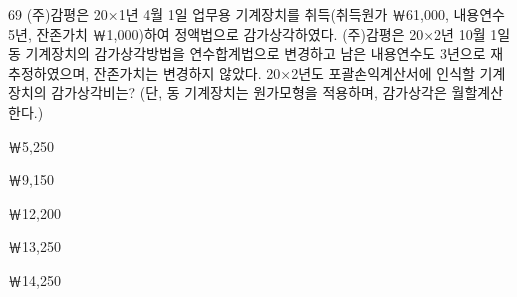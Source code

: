 \begin{question}{69}
(주)감평은 20×1년 4월 1일 업무용 기계장치를 취득(취득원가 ￦61,000, 내용연수 5년, 잔존가치 ￦1,000)하여 정액법으로 감가상각하였다. (주)감평은 20×2년 10월 1일 동 기계장치의 감가상각방법을 연수합계법으로 변경하고 남은 내용연수도 3년으로 재추정하였으며, 잔존가치는 변경하지 않았다. 20×2년도 포괄손익계산서에 인식할 기계장치의 감가상각비는? (단, 동 기계장치는 원가모형을 적용하며, 감가상각은 월할계산한다.)
\begin{choices}
  \item ￦5,250
  \item ￦9,150
  \item ￦12,200
  \item ￦13,250
  \item ￦14,250
\end{choices}
\end{question}
\answerall
{}

